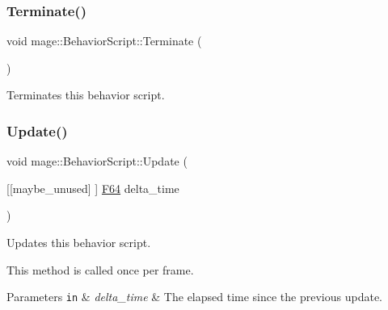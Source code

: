 \subsubsection{\texorpdfstring{Terminate()}{Terminate()}}
{\footnotesize\ttfamily void mage\+::\+Behavior\+Script\+::\+Terminate (\begin{DoxyParamCaption}{ }\end{DoxyParamCaption})\hspace{0.3cm}{\ttfamily [noexcept]}}

Terminates this behavior script. \hypertarget{classmage_1_1_behavior_script_afb9cf3759edf8876416d1df85489cba6}{}\label{classmage_1_1_behavior_script_afb9cf3759edf8876416d1df85489cba6} 
\subsubsection{\texorpdfstring{Update()}{Update()}}
{\footnotesize\ttfamily void mage\+::\+Behavior\+Script\+::\+Update (\begin{DoxyParamCaption}\item[{\mbox{[}\mbox{[}maybe\+\_\+unused\mbox{]} \mbox{]} \hyperlink{namespacemage_ad26233bbec640deda836e572c1a23708}{F64}}]{delta\+\_\+time }\end{DoxyParamCaption})\hspace{0.3cm}{\ttfamily [virtual]}}

Updates this behavior script.

This method is called once per frame.


\begin{DoxyParams}[1]{Parameters}
\mbox{\tt in}  & {\em delta\+\_\+time} & The elapsed time since the previous update. \\
\hline
\end{DoxyParams}


